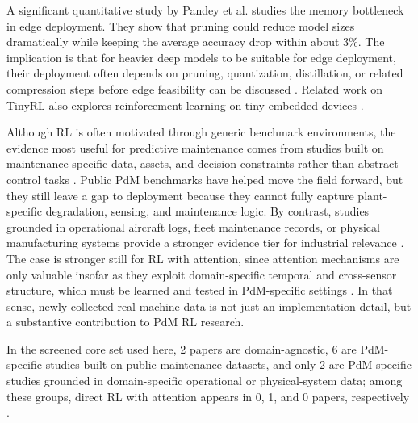 \documentclass[sn-basic]{sn-jnl} %
\begin{document}

A significant quantitative study by Pandey et al. \cite{Pandey2023} studies the memory bottleneck in edge deployment. They show that pruning could reduce model sizes dramatically while keeping the average accuracy drop within about 3\%. The implication is that for heavier deep models to be suitable for edge deployment, their deployment often depends on pruning, quantization, distillation, or related compression steps before edge feasibility can be discussed \cite{Pandey2023, Jang2020, Xu2022}. Related work on TinyRL also explores reinforcement learning on tiny embedded devices \cite{Szydlo2022}.

Although RL is often motivated through generic benchmark environments, the evidence most useful for predictive maintenance comes from studies built on maintenance-specific data, assets, and decision constraints rather than abstract control tasks \cite{Andrade2021Aircraft,Dangut2022RareFailure,Zhao2024,Siraskar2025}. Public PdM benchmarks have helped move the field forward, but they still leave a gap to deployment because they cannot fully capture plant-specific degradation, sensing, and maintenance logic. By contrast, studies grounded in operational aircraft logs, fleet maintenance records, or physical manufacturing systems provide a stronger evidence tier for industrial relevance \cite{Andrade2021Aircraft,Dangut2022RareFailure,Chen2024DigitalTwin}. The case is stronger still for RL with attention, since attention mechanisms are only valuable insofar as they exploit domain-specific temporal and cross-sensor structure, which must be learned and tested in PdM-specific settings \cite{Zhao2024}. In that sense, newly collected real machine data is not just an implementation detail, but a substantive contribution to PdM RL research.

In the screened core set used here, 2 papers are domain-agnostic, 6 are PdM-specific studies built on public maintenance datasets, and only 2 are PdM-specific studies grounded in domain-specific operational or physical-system data; among these groups, direct RL with attention appears in 0, 1, and 0 papers, respectively \cite{DulacArnold2021,GarauLuis2021,Zhao2024,Aglogallos2026,Siraskar2025,Andrade2021Aircraft,Dangut2022RareFailure,Chen2024DigitalTwin}.
\end{document}
